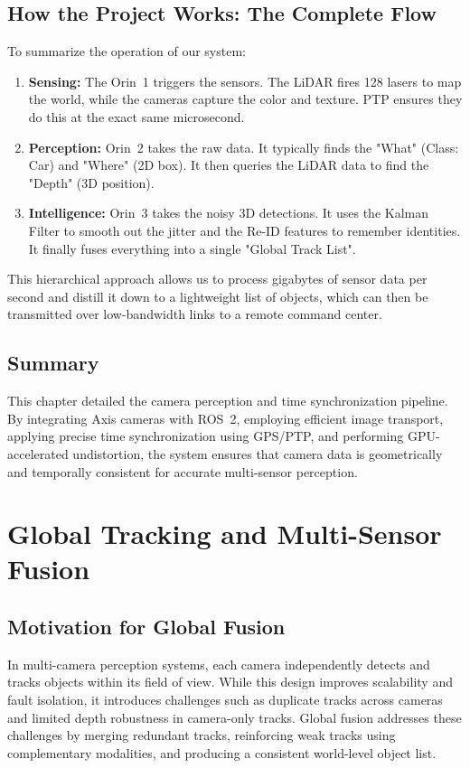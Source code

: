 \documentclass[12pt,a4paper]{report}
\begin{document}
\section{How the Project Works: The Complete Flow}
To summarize the operation of our system:
\begin{enumerate}
    \item \textbf{Sensing:} The Orin~1 triggers the sensors. The LiDAR fires 128 lasers to map the world, while the cameras capture the color and texture. PTP ensures they do this at the exact same microsecond.
    \item \textbf{Perception:} Orin~2 takes the raw data. It typically finds the "What" (Class: Car) and "Where" (2D box). It then queries the LiDAR data to find the "Depth" (3D position).
    \item \textbf{Intelligence:} Orin~3 takes the noisy 3D detections. It uses the Kalman Filter to smooth out the jitter and the Re-ID features to remember identities. It finally fuses everything into a single "Global Track List".
\end{enumerate}
This hierarchical approach allows us to process gigabytes of sensor data per second and distill it down to a lightweight list of objects, which can then be transmitted over low-bandwidth links to a remote command center.

\section{Summary}
This chapter detailed the camera perception and time synchronization pipeline. By integrating Axis cameras with ROS~2, employing efficient image transport, applying precise time synchronization using GPS/PTP, and performing GPU-accelerated undistortion, the system ensures that camera data is geometrically and temporally consistent for accurate multi-sensor perception.

\chapter{Global Tracking and Multi-Sensor Fusion}

\section{Motivation for Global Fusion}
In multi-camera perception systems, each camera independently detects and tracks objects within its field of view. While this design improves scalability and fault isolation, it introduces challenges such as duplicate tracks across cameras and limited depth robustness in camera-only tracks. Global fusion addresses these challenges by merging redundant tracks, reinforcing weak tracks using complementary modalities, and producing a consistent world-level object list.
\end{document}
